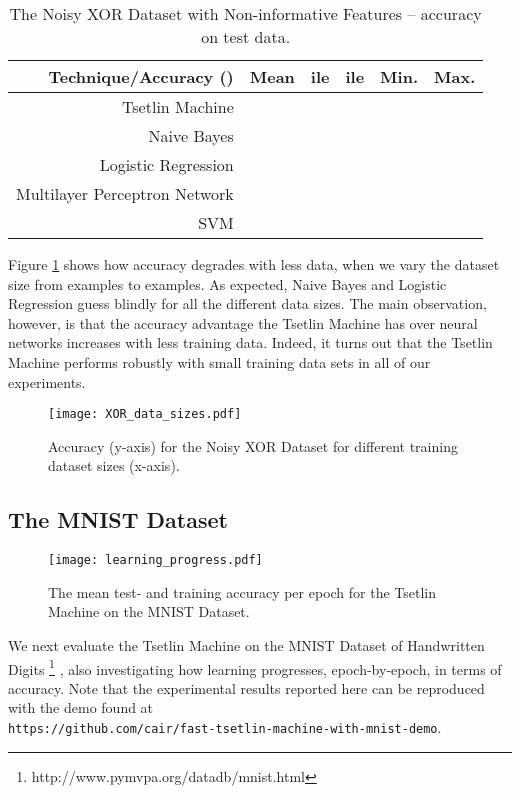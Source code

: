 \documentclass[11pt,a4paper]{article}
\begin{document}
\begin{table}[!bh]
    \centering
    \begin{tabular}{r||c|c|c|c|c}
         \bf Technique/Accuracy ()&\bf Mean&\bf ile &\bf ile&\bf Min.&\bf Max.\\
         \hline
    Tsetlin Machine&&&&&\\
    Naive Bayes&&&&&\\
    Logistic Regression&&&&&\\
    Multilayer Perceptron Network&&&&&\\
    SVM&&&&&
    \end{tabular}
    \caption{The Noisy XOR Dataset with Non-informative Features -- accuracy on test data.}
    \label{tab:xor_test}
\end{table}

Figure \ref{figure:xor_data_sizes} shows how accuracy degrades with less data, when we vary the dataset size from  examples to  examples. As expected, Naive Bayes and Logistic Regression guess blindly for all the different data sizes. The main observation, however, is that the accuracy advantage the Tsetlin Machine has over  neural networks increases with less training data. Indeed, it turns out that the Tsetlin Machine performs robustly with small training data sets in all of our experiments.

\begin{figure}[!ht]
\centering
\texttt{[image: XOR\_data\_sizes.pdf]}
\caption{Accuracy (y-axis) for the Noisy XOR Dataset for different training dataset sizes (x-axis).}
\label{figure:xor_data_sizes}
\end{figure}

\subsection{The MNIST Dataset}

\begin{figure}[!ht]
\centering
\texttt{[image: learning\_progress.pdf]}
\caption{The mean test- and training accuracy per epoch for the Tsetlin Machine on the MNIST Dataset.}
\label{figure:learning_progress}
\end{figure}

We next evaluate the Tsetlin Machine on the MNIST Dataset of Handwritten Digits \footnote{http://www.pymvpa.org/datadb/mnist.html} \cite{LeCun1998}, also investigating how learning progresses, epoch-by-epoch, in terms of accuracy. Note that the experimental results reported here can be reproduced with the demo found at\\ {\tt https://github.com/cair/fast-tsetlin-machine-with-mnist-demo}.
\end{document}
